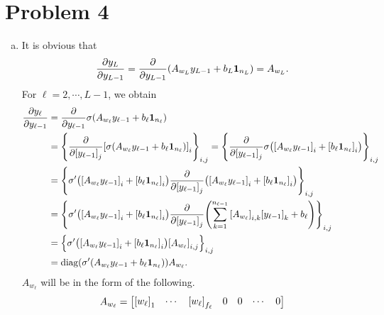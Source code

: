 \documentclass[10pt]{article}
\begin{document}
\section*{Problem 4}
\noindent{}
\begin{enumerate}[(a)]
    \item It is obvious that
    \begin{align*}
        \frac{\partial y_L}{\partial y_{L-1}} = \frac{\partial}{\partial y_{L-1}}\qty(A_{w_L}y_{L-1} + b_L\mathbf{1}_{n_L}) = A_{w_L}.
    \end{align*}
    For $\ell = 2, \cdots, L-1$, we obtain
    \begin{align*}
        \frac{\partial y_\ell}{\partial y_{\ell-1}} &= \frac{\partial}{\partial y_{\ell-1}}\sigma\qty(A_{w_\ell}y_{\ell-1} + b_\ell\mathbf{1}_{n_\ell}) \\
        &= \qty{\frac{\partial}{\partial\qty[y_{\ell-1}]_j}\qty[\sigma\qty(A_{w_\ell}y_{\ell-1} + b_\ell\mathbf{1}_{n_\ell})]_i}_{i, j} = \qty{\frac{\partial}{\partial\qty[y_{\ell-1}]_j}\sigma\qty(\qty[A_{w_\ell}y_{\ell-1}]_i + \qty[b_\ell\mathbf{1}_{n_\ell}]_i)}_{i, j} \\
        &= \qty{\sigma'\qty(\qty[A_{w_\ell}y_{\ell-1}]_i + \qty[b_\ell\mathbf{1}_{n_\ell}]_i)\frac{\partial}{\partial\qty[y_{\ell-1}]_j}\qty(\qty[A_{w_\ell}y_{\ell-1}]_i + \qty[b_\ell\mathbf{1}_{n_\ell}]_i)}_{i, j} \\
        &= \qty{\sigma'\qty(\qty[A_{w_\ell}y_{\ell-1}]_i + \qty[b_\ell\mathbf{1}_{n_\ell}]_i)\frac{\partial}{\partial\qty[y_{\ell-1}]_j}\qty(\sum_{k=1}^{n_{\ell-1}}\qty[A_{w_\ell}]_{i, k}\qty[y_{\ell-1}]_k + b_\ell)}_{i, j} \\
        &= \qty{\sigma'\qty(\qty[A_{w_\ell}y_{\ell-1}]_i + \qty[b_\ell\mathbf{1}_{n_\ell}]_i)\qty[A_{w_\ell}]_{i, j}}_{i, j} \\
        &= \mathrm{diag}\qty(\sigma'\qty(A_{w_\ell}y_{\ell-1} + b_\ell\mathbf{1}_{n_\ell}))A_{w_\ell}.
    \end{align*}
    $A_{w_\ell}$ will be in the form of the following.
    $$A_{w_\ell} = \begin{bmatrix}
        \qty[w_\ell]_1 & \cdots         & \qty[w_\ell]_{f_\ell} & 0                     & 0                     & \cdots                & 0      \\

\end{bmatrix}$$
\end{enumerate}
\end{document}
